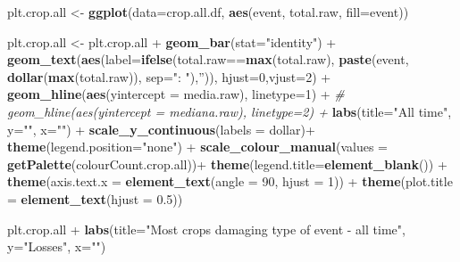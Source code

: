 \documentclass[]{article}
\newenvironment{Shaded}{\begin{snugshade}}{\end{snugshade}}
\newcommand{\KeywordTok}[1]{\textcolor[rgb]{0.13,0.29,0.53}{\textbf{{#1}}}}
\newcommand{\DataTypeTok}[1]{\textcolor[rgb]{0.13,0.29,0.53}{{#1}}}
\newcommand{\DecValTok}[1]{\textcolor[rgb]{0.00,0.00,0.81}{{#1}}}
\newcommand{\FloatTok}[1]{\textcolor[rgb]{0.00,0.00,0.81}{{#1}}}
\newcommand{\StringTok}[1]{\textcolor[rgb]{0.31,0.60,0.02}{{#1}}}
\newcommand{\CommentTok}[1]{\textcolor[rgb]{0.56,0.35,0.01}{\textit{{#1}}}}
\newcommand{\NormalTok}[1]{{#1}}
\begin{document}
\begin{Shaded}
\begin{Highlighting}[]
\NormalTok{plt.crop.all <-}\StringTok{ }\KeywordTok{ggplot}\NormalTok{(}\DataTypeTok{data=}\NormalTok{crop.all.df, }\KeywordTok{aes}\NormalTok{(event, total.raw, }\DataTypeTok{fill=}\NormalTok{event))}

\NormalTok{plt.crop.all <-}\StringTok{ }\NormalTok{plt.crop.all +}\StringTok{ }\KeywordTok{geom_bar}\NormalTok{(}\DataTypeTok{stat=}\StringTok{"identity"}\NormalTok{) +}
\StringTok{                }
\StringTok{        }\KeywordTok{geom_text}\NormalTok{(}\KeywordTok{aes}\NormalTok{(}\DataTypeTok{label=}\KeywordTok{ifelse}\NormalTok{(total.raw==}\KeywordTok{max}\NormalTok{(total.raw),}
                \KeywordTok{paste}\NormalTok{(event, }\KeywordTok{dollar}\NormalTok{(}\KeywordTok{max}\NormalTok{(total.raw)), }\DataTypeTok{sep=}\StringTok{": "}\NormalTok{),}\StringTok{''}\NormalTok{)),}
                \DataTypeTok{hjust=}\DecValTok{0}\NormalTok{,}\DataTypeTok{vjust=}\DecValTok{2}\NormalTok{) +}
\StringTok{        }\KeywordTok{geom_hline}\NormalTok{(}\KeywordTok{aes}\NormalTok{(}\DataTypeTok{yintercept =} \NormalTok{media.raw), }\DataTypeTok{linetype=}\DecValTok{1}\NormalTok{) +}
\StringTok{        }\CommentTok{# geom_hline(aes(yintercept = mediana.raw), linetype=2) +}
\StringTok{        }\KeywordTok{labs}\NormalTok{(}\DataTypeTok{title=}\StringTok{"All time"}\NormalTok{, }\DataTypeTok{y=}\StringTok{""}\NormalTok{, }\DataTypeTok{x=}\StringTok{""}\NormalTok{) +}\StringTok{ }
\StringTok{                }
\StringTok{        }\KeywordTok{scale_y_continuous}\NormalTok{(}\DataTypeTok{labels =} \NormalTok{dollar)+}
\StringTok{     }
\StringTok{        }\KeywordTok{theme}\NormalTok{(}\DataTypeTok{legend.position=}\StringTok{"none"}\NormalTok{) +}\StringTok{        }
\StringTok{        }\KeywordTok{scale_colour_manual}\NormalTok{(}\DataTypeTok{values =} \KeywordTok{getPalette}\NormalTok{(colourCount.crop.all))+}\StringTok{                }
\StringTok{        }\KeywordTok{theme}\NormalTok{(}\DataTypeTok{legend.title=}\KeywordTok{element_blank}\NormalTok{()) +}
\StringTok{        }\KeywordTok{theme}\NormalTok{(}\DataTypeTok{axis.text.x =} \KeywordTok{element_text}\NormalTok{(}\DataTypeTok{angle =} \DecValTok{90}\NormalTok{, }\DataTypeTok{hjust =} \DecValTok{1}\NormalTok{)) +}\StringTok{ }
\StringTok{        }\KeywordTok{theme}\NormalTok{(}\DataTypeTok{plot.title =} \KeywordTok{element_text}\NormalTok{(}\DataTypeTok{hjust =} \FloatTok{0.5}\NormalTok{))                 }

\NormalTok{plt.crop.all +}\StringTok{ }\KeywordTok{labs}\NormalTok{(}\DataTypeTok{title=}\StringTok{"Most crops damaging type of event - all time"}\NormalTok{,}
                    \DataTypeTok{y=}\StringTok{"Losses"}\NormalTok{, }\DataTypeTok{x=}\StringTok{""}\NormalTok{)}
\end{Highlighting}
\end{Shaded}
\end{document}
